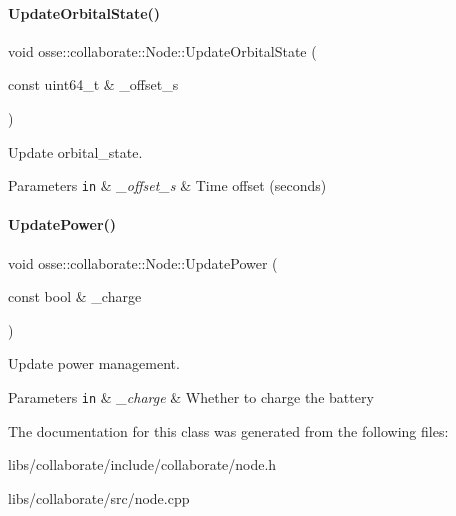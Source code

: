 \paragraph{\texorpdfstring{Update\+Orbital\+State()}{UpdateOrbitalState()}}
{\footnotesize\ttfamily void osse\+::collaborate\+::\+Node\+::\+Update\+Orbital\+State (\begin{DoxyParamCaption}\item[{const uint64\+\_\+t \&}]{\+\_\+offset\+\_\+s }\end{DoxyParamCaption})\hspace{0.3cm}{\ttfamily [private]}}



Update orbital\+\_\+state. 


\begin{DoxyParams}[1]{Parameters}
\mbox{\tt in}  & {\em \+\_\+offset\+\_\+s} & Time offset (seconds) \\
\hline
\end{DoxyParams}
\mbox{\label{classosse_1_1collaborate_1_1_node_ac5741490b2b8c184a8825a683ac8c48c}} 
\paragraph{\texorpdfstring{Update\+Power()}{UpdatePower()}}
{\footnotesize\ttfamily void osse\+::collaborate\+::\+Node\+::\+Update\+Power (\begin{DoxyParamCaption}\item[{const bool \&}]{\+\_\+charge }\end{DoxyParamCaption})\hspace{0.3cm}{\ttfamily [private]}}



Update power management. 


\begin{DoxyParams}[1]{Parameters}
\mbox{\tt in}  & {\em \+\_\+charge} & Whether to charge the battery \\
\hline
\end{DoxyParams}


The documentation for this class was generated from the following files\+:\begin{DoxyCompactItemize}
\item 
libs/collaborate/include/collaborate/node.\+h\item 
libs/collaborate/src/node.\+cpp\end{DoxyCompactItemize}
